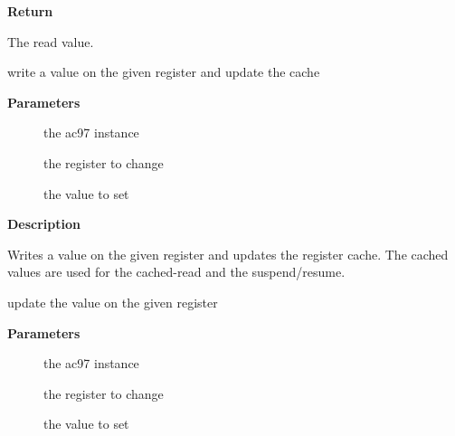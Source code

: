 \documentclass[a4paper,8pt,english]{sphinxmanual}
\begin{document}
\textbf{Return}

The read value.

\begin{fulllineitems}
\label{sound/kernel-api/alsa-driver-api:c.snd_ac97_write_cache}
write a value on the given register and update the cache

\end{fulllineitems}


\textbf{Parameters}
\begin{description}
\item[{}] \leavevmode
the ac97 instance

\item[{}] \leavevmode
the register to change

\item[{}] \leavevmode
the value to set

\end{description}

\textbf{Description}

Writes a value on the given register and updates the register
cache.  The cached values are used for the cached-read and the
suspend/resume.

\begin{fulllineitems}
\label{sound/kernel-api/alsa-driver-api:c.snd_ac97_update}
update the value on the given register

\end{fulllineitems}


\textbf{Parameters}
\begin{description}
\item[{}] \leavevmode
the ac97 instance

\item[{}] \leavevmode
the register to change

\item[{}] \leavevmode
the value to set

\end{description}
\end{document}
